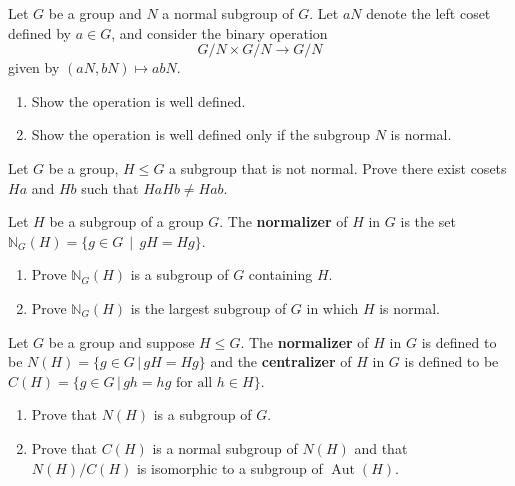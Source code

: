 \documentclass[11pt,twoside,openany]{memoir}
\begin{document}
        \begin{exercise}
        Let $G$ be a group and $N$ a normal subgroup of $G$. Let $aN$ denote the left coset defined by $a\in G$, and consider the binary operation
        \[
        G/N\times G/N\to G/N
        \]
        given by $(aN, bN)\mapsto abN$.
        \begin{enumerate}[label=(\alph*)]
            \item Show the operation is well defined.
            \item Show the operation is well defined only if the subgroup $N$ is normal.
        \end{enumerate}
        \end{exercise}
        
        \begin{exercise}
        Let $G$ be a group, $H\le G$ a subgroup that is not normal. Prove there exist cosets $Ha$ and $Hb$ such that $HaHb\neq Hab$.
        \end{exercise}
        
        \begin{exercise}
        Let $H$ be a subgroup of a group $G$. The \textbf{normalizer} of $H$ in $G$ is the set $\mathbb{N}_G(H)=\{g\in G\,\mid\, gH=Hg\}$.
        \begin{enumerate}[label=(\alph*)]
            \item Prove $\mathbb{N}_G(H)$ is a subgroup of $G$ containing $H$.
            \item Prove $\mathbb{N}_G(H)$ is the largest subgroup of $G$ in which $H$ is normal.
        \end{enumerate}
        \end{exercise}
        
        \begin{exercise}
        Let $G$ be a group and suppose $H\le G$. The \textbf{normalizer} of $H$ in $G$ is defined to be $N(H)=\{g\in G\,|\, gH=Hg\}$ and the \textbf{centralizer} of $H$ in $G$ is defined to be $C(H)=\{g\in G\,|\,  gh=hg\text{ for all }h\in H\}$.
        \begin{enumerate}[label=(\alph*)]
            \item Prove that $N(H)$ is a subgroup of $G$.
            \item Prove that $C(H)$ is a normal subgroup of $N(H)$ and that $N(H)/C(H)$ is isomorphic to a subgroup of $\operatorname{Aut}(H)$.
        \end{enumerate}
        \end{exercise}
\end{document}
